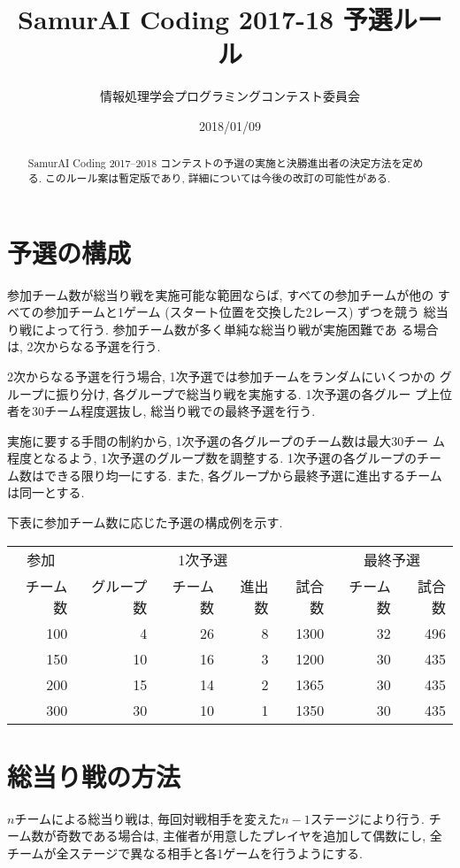\documentclass[11pt]{jarticle}
\title{SamurAI Coding 2017-18 予選ルール}
\author{情報処理学会プログラミングコンテスト委員会}
\date{2018/01/09}
\begin{document}
\maketitle

\begin{abstract}
  SamurAI Coding 2017--2018 コンテストの予選の実施と決勝進出者の決定方法を定める.
  このルール案は暫定版であり, 詳細については今後の改訂の可能性がある.
\end{abstract}

\section{予選の構成}

参加チーム数が総当り戦を実施可能な範囲ならば, すべての参加チームが他の
すべての参加チームと1ゲーム (スタート位置を交換した2レース) ずつを競う
総当り戦によって行う.  参加チーム数が多く単純な総当り戦が実施困難であ
る場合は, 2次からなる予選を行う.

2次からなる予選を行う場合, 1次予選では参加チームをランダムにいくつかの
グループに振り分け, 各グループで総当り戦を実施する.  1次予選の各グルー
プ上位者を30チーム程度選抜し, 総当り戦での最終予選を行う.

実施に要する手間の制約から, 1次予選の各グループのチーム数は最大30チー
ム程度となるよう, 1次予選のグループ数を調整する.
1次予選の各グループのチーム数はできる限り均一にする.
また, 各グループから最終予選に進出するチームは同一とする.

下表に参加チーム数に応じた予選の構成例を示す.

\begin{table}[h]
  \begin{center}
    \begin{tabular}{r|rrrr|rr}
      \multicolumn{1}{c|}{参加}&\multicolumn{4}{c|}{1次予選}&\multicolumn{2}{c}{最終予選}\\
      チーム数&グループ数&チーム数&進出数&試合数&チーム数&試合数\\
      \hline
      100&4&26&8&1300&32&496\\
      150&10&16&3&1200&30&435\\
      200&15&14&2&1365&30&435\\
      300&30&10&1&1350&30&435\\
    \end{tabular}
  \end{center}
\end{table}

\section{総当り戦の方法}
$n$チームによる総当り戦は, 毎回対戦相手を変えた$n-1$ステージにより行う.
チーム数が奇数である場合は, 主催者が用意したプレイヤを追加して偶数にし,
全チームが全ステージで異なる相手と各1ゲームを行うようにする.
\end{document}
